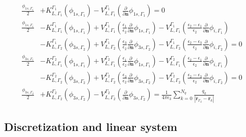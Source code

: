 \begin{align} \label{eq:integral_eq_lspr_system}
\frac{\phi_{1s,\Gamma_1}}{2}&+ K_{L,\Gamma_1}^{\Gamma_1}(\phi_{1s,\Gamma_1}) - V_{L,\Gamma_1}^{\Gamma_1} \left(\frac{\partial}{\partial \mathbf{n}}\phi_{1s,\Gamma_1} \right) = 0  \nonumber \\
 \frac{\phi_{1s,\Gamma_1}}{2}& - K_{L,\Gamma_1}^{\Gamma_1}(\phi_{1s,\Gamma_1}) + V_{L,\Gamma_1}^{\Gamma_1} \left(\frac{\epsilon_1}{\epsilon_2}\frac{\partial}{\partial \mathbf{n}}\phi_{1s,\Gamma_1} \right) - V_{L,\Gamma_1}^{\Gamma_1} \left(\frac{\epsilon_2-\epsilon_1}{\epsilon_2}\frac{\partial}{\partial \mathbf{n}}\phi_{i,\Gamma_1} \right) \nonumber\\ 
 & - K_{L,\Gamma_2}^{\Gamma_1}(\phi_{3s,\Gamma_2}) + V_{L,\Gamma_2}^{\Gamma_1} \left(\frac{\epsilon_3}{\epsilon_2}\frac{\partial}{\partial \mathbf{n}}\phi_{3s,\Gamma_2} \right)  - V_{L,\Gamma_2}^{\Gamma_1} \left(\frac{\epsilon_2 -\epsilon_3}{\epsilon_2}\frac{\partial}{\partial \mathbf{n}}\phi_{i,\Gamma_2} \right) = 0   \nonumber \\
 \frac{\phi_{3s,\Gamma_1}}{2}& - K_{L,\Gamma_1}^{\Gamma_2}(\phi_{1s,\Gamma_1}) + V_{L,\Gamma_1}^{\Gamma_2} \left(\frac{\epsilon_1}{\epsilon_2}\frac{\partial}{\partial \mathbf{n}}\phi_{1s,\Gamma_1} \right) - V_{L,\Gamma_1}^{\Gamma_2} \left(\frac{\epsilon_2-\epsilon_1}{\epsilon_2}\frac{\partial}{\partial \mathbf{n}}\phi_{i,\Gamma_1} \right) \nonumber \\
& - K_{L,\Gamma_2}^{\Gamma_2}(\phi_{3s,\Gamma_2}) + V_{L,\Gamma_2}^{\Gamma_2} \left(\frac{\epsilon_3}{\epsilon_2}\frac{\partial}{\partial \mathbf{n}}\phi_{3s,\Gamma_2} \right)  - V_{L,\Gamma_2}^{\Gamma_2} \left(\frac{\epsilon_2 -\epsilon_3}{\epsilon_2}\frac{\partial}{\partial \mathbf{n}}\phi_{i,\Gamma_2} \right) = 0  \nonumber \\
\frac{\phi_{3s,\Gamma_2}}{2}& + K_{L,\Gamma_2}^{\Gamma_2}(\phi_{3s,\Gamma_2}) - V_{L,\Gamma_2}^{\Gamma_2} \left( \frac{\partial}{\partial \mathbf{n}} \phi_{3s,\Gamma_2} \right) = \frac{1}{4\pi\epsilon_3} \sum_{k=0}^{N_q} \frac{q_k}{|\mathbf{r}_{\Gamma_2} - \mathbf{r}_k|} 
\end{align}



\subsection{Discretization and linear system}

